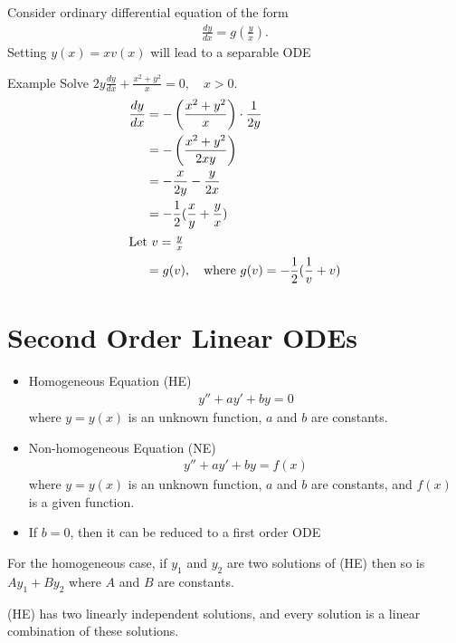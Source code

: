 \documentclass{report}
\begin{document}
			Consider ordinary differential equation of the form
			\begin{align*}
				\frac{dy}{dx} = g(\frac{y}{x}).
			\end{align*}
			Setting $y(x) = xv(x)$ will lead to a separable ODE

			\begin{question}{Example}
				Solve $2y \frac{dy}{dx} + \frac{x^2 + y^2}{x} = 0, \quad x > 0$.
				\begin{align*}
					\frac{dy}{dx} &= -\left(\frac{x^2 + y^2}{x}\right) \cdot \frac{1}{2y}	\\
								  &= - \left(\frac{x^2 + y^2}{2xy}\right)	\\
								  &= - \frac{x}{2y} - \frac{y}{2x}	\\
								  &= -\frac{1}{2} (\frac{x}{y} + \frac{y}{x})	\\
								  \intertext{Let $v=\frac{y}{x}$}
								  &= g(v), \quad \text{where } g(v) = -\frac{1}{2} (\frac{1}{v} + v)
				\end{align*}
			\end{question}

	\section{Second Order Linear ODEs}

		\begin{itemize}
			\item Homogeneous Equation (HE)
				\begin{align*}
					y'' + ay' + by = 0
				\end{align*}
				where $y = y(x)$ is an unknown function, $a$ and $b$ are constants.
			\item Non-homogeneous Equation (NE)
				\begin{align*}
					y'' + ay' + by = f(x)
				\end{align*}
				where $y = y(x)$ is an unknown function, $a$ and $b$ are constants, and $f(x)$ is a given function.
			\item If $b = 0$, then it can be reduced to a first order ODE
		\end{itemize}

		For the homogeneous case, if $y_1$ and $y_2$ are two solutions of (HE) then so is $Ay_1 + By_2$ where $A$ and $B$ are constants.

		(HE) has two linearly independent solutions, and every solution is a linear combination of these solutions.
\end{document}
